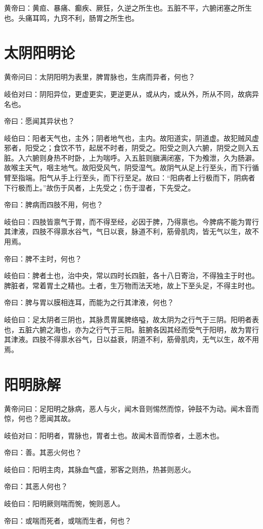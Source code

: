 \documentclass{article}%
\begin{document}
黄帝曰：黄疸、暴痛、癫疾、厥狂，久逆之所生也。五脏不平，六腑闭塞之所生也。头痛耳鸣，九窍不利，肠胃之所生也。
\section{太阴阳明论}
黄帝问曰：太阴阳明为表里，脾胃脉也，生病而异者，何也？

岐伯对曰：阴阳异位，更虚更实，更逆更从，或从内，或从外，所从不同，故病异名也。

帝曰：愿闻其异状也？

岐伯曰：阳者天气也，主外；阴者地气也，主内。故阳道实，阴道虚。故犯贼风虚邪者，阳受之；食饮不节，起居不时者，阴受之。阳受之则入六腑，阴受之则入五脏。入六腑则身热不时卧，上为喘呼。入五脏则䐜满闭塞，下为飧泄，久为肠澼。故喉主天气，咽主地气。故阳受风气，阴受湿气。故阴气从足上行至头，而下行循臂至指端。阳气从手上行至头，而下行至足。故曰：“阳病者上行极而下，阴病者下行极而上。”故伤于风者，上先受之；伤于湿者，下先受之。

帝曰：脾病而四肢不用，何也？

岐伯曰：四肢皆禀气于胃，而不得至经，必因于脾，乃得禀也。今脾病不能为胃行其津液，四肢不得禀水谷气，气日以衰，脉道不利，筋骨肌肉，皆无气以生，故不用焉。

帝曰：脾不主时，何也？

岐伯曰：脾者土也，治中央，常以四时长四脏，各十八日寄治，不得独主于时也。脾脏者，常着胃土之精也。土者，生万物而法天地，故上下至头足，不得主时也。

帝曰：脾与胃以膜相连耳，而能为之行其津液，何也？

岐伯曰：足太阴者三阴也，其脉贯胃属脾络嗌，故太阴为之行气于三阴。阳明者表也，五脏六腑之海也，亦为之行气于三阳。脏腑各因其经而受气于阳明，故为胃行其津液。四肢不得禀水谷气，日以益衰，阴道不利，筋骨肌肉，无气以生，故不用焉。
\section{阳明脉解}
黄帝问曰：足阳明之脉病，恶人与火，闻木音则惕然而惊，钟鼓不为动。闻木音而惊，何也？愿闻其故。

岐伯对曰：阳明者，胃脉也，胃者土也。故闻木音而惊者，土恶木也。

帝曰：善。其恶火何也？

岐伯曰：阳明主肉，其脉血气盛，邪客之则热，热甚则恶火。

帝曰：其恶人何也？

岐伯曰：阳明厥则喘而惋，惋则恶人。

帝曰：或喘而死者，或喘而生者，何也？
\end{document}
